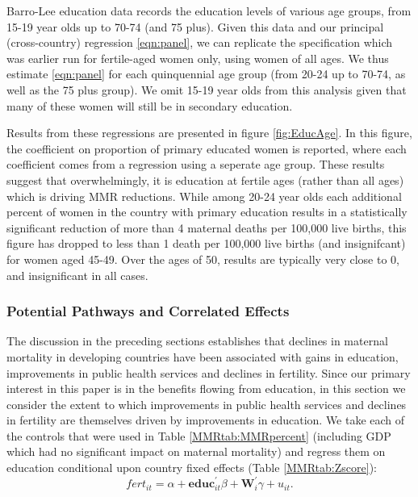 \documentclass{article}[12pt,subeqn]
\begin{document}
\begin{spacing}{1.4}
Barro-Lee education data records the education levels of various age groups,
from 15-19 year olds up to 70-74 (and 75 plus).  Given this data and our
principal (cross-country) regression \ref{eqn:panel}, we can replicate the
specification which was earlier run for fertile-aged women only, using women of
all ages.  We thus estimate \ref{eqn:panel} for each quinquennial age group
(from 20-24 up to 70-74, as well as the 75 plus group).  We omit
15-19 year olds from this analysis given that many of these women will still
be in secondary education.

Results from these regressions are presented in figure \ref{fig:EducAge}. In
this figure, the coefficient on proportion of primary educated women is reported,
where each coefficient comes from a regression using a seperate age group.
These results suggest that overwhelmingly, it is education at fertile ages (rather
than all ages) which is driving MMR reductions.  While among 20-24 year olds
each additional percent of women in the country with primary education results in
a statistically significant reduction of more than 4 maternal deaths per 100,000
live births, this figure has dropped to less than 1 death per
100,000 live births (and insignifcant) for women aged 45-49.  Over the ages
of 50, results are typically very close to 0, and insignificant in all cases.


\subsubsection{Potential Pathways and Correlated Effects}
\label{ssscn:effects}
The discussion in the preceding sections establishes that declines in maternal 
mortality in developing countries have been associated with gains in education, 
improvements in public health services and declines in fertility. Since our 
primary interest in this paper is in the benefits flowing from education, in this 
section we consider the extent to which improvements in public health services and 
declines in fertility are themselves driven by improvements in education. We take 
each of the controls that were used in Table \ref{MMRtab:MMRpercent} (including 
GDP which had no significant impact on maternal mortality) and regress them on 
education conditional upon country fixed effects (Table \ref{MMRtab:Zscore}):
\begin{equation}
\label{eqn:Zscore}
  fert_{it}=\alpha + \mathbf{educ}^\prime_{it}\beta + \mathbf{W}^\prime_i\gamma 
  + u_{it}.
\end{equation}


\end{spacing}
\end{document}
